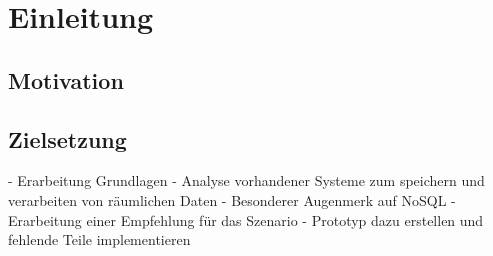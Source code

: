 \section{Einleitung}


\subsection{Motivation}




\subsection{Zielsetzung}
- Erarbeitung Grundlagen
- Analyse vorhandener Systeme zum speichern und verarbeiten von räumlichen Daten
- Besonderer Augenmerk auf NoSQL
- Erarbeitung einer Empfehlung für das Szenario
- Prototyp dazu erstellen und fehlende Teile implementieren
